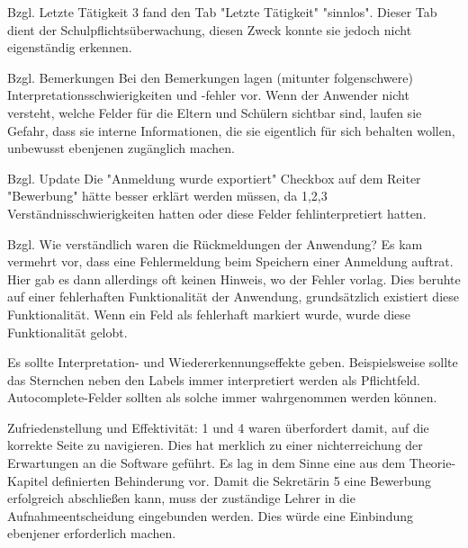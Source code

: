 Bzgl. Letzte Tätigkeit
3 fand den Tab "Letzte Tätigkeit" "sinnlos". Dieser Tab dient der Schulpflichtsüberwachung, diesen Zweck konnte sie jedoch nicht eigenständig erkennen.

Bzgl. Bemerkungen
Bei den Bemerkungen lagen (mitunter folgenschwere) Interpretationsschwierigkeiten und -fehler vor. Wenn der Anwender nicht versteht, welche Felder für die Eltern und Schülern sichtbar sind, laufen sie Gefahr, dass sie interne Informationen, die sie eigentlich für sich behalten wollen, unbewusst ebenjenen zugänglich machen. 

Bzgl. Update
Die "Anmeldung wurde exportiert" Checkbox auf dem Reiter "Bewerbung" hätte besser erklärt werden müssen, da 1,2,3 Verständnisschwierigkeiten hatten oder diese Felder fehlinterpretiert hatten.

Bzgl. Wie verständlich waren die Rückmeldungen der Anwendung?
Es kam vermehrt vor, dass eine Fehlermeldung beim Speichern einer Anmeldung auftrat. Hier gab es dann allerdings oft keinen Hinweis, wo der Fehler vorlag. Dies beruhte auf einer fehlerhaften Funktionalität der Anwendung, grundsätzlich existiert diese Funktionalität. Wenn ein Feld als fehlerhaft markiert wurde, wurde diese Funktionalität gelobt.

Es sollte Interpretation- und Wiedererkennungseffekte geben. Beispielsweise sollte das Sternchen neben den Labels immer interpretiert werden als Pflichtfeld. Autocomplete-Felder sollten als solche immer wahrgenommen werden können.

Zufriedenstellung und Effektivität:
1 und 4 waren überfordert damit, auf die korrekte Seite zu navigieren. Dies hat merklich zu einer nichterreichung der Erwartungen an die Software geführt. Es lag in dem Sinne eine aus dem Theorie-Kapitel definierten Behinderung vor.
Damit die Sekretärin 5 eine Bewerbung erfolgreich abschließen kann, muss der zuständige Lehrer in die Aufnahmeentscheidung eingebunden werden. Dies würde eine Einbindung ebenjener erforderlich machen.

